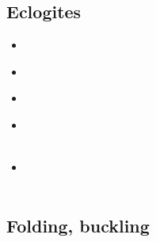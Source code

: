 \subsection{Eclogites} 

\begin{scriptsize}
\begin{itemize}
\item[\twothousandone] 
\textcite{dohe01} \\
\item[\twothousandseven] 
\textcite{hecb07} \\
\item[\twothousandnine] 
\textcite{agyj09} \\
\item[\twothousandthirteen] 
\textcite{arbi13} \\
\textcite{krcu13} \\
\item[\twothousandtwentytwo] 
\textcite{wakw22} \\
\textcite{yadb22} \\
\end{itemize}
\end{scriptsize}


\subsection{Folding, buckling} 


